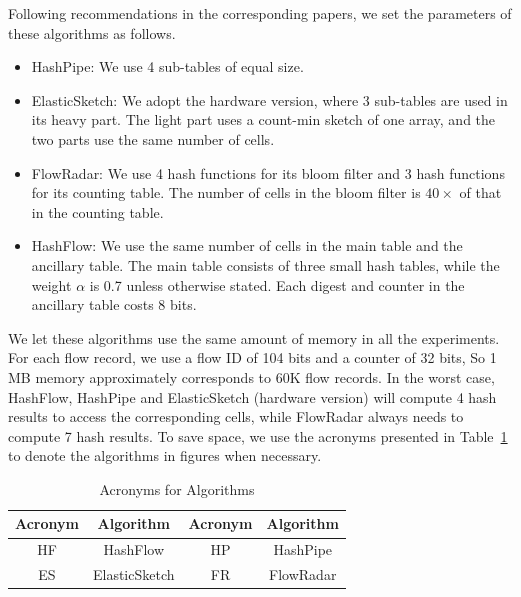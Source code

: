 Following recommendations in the corresponding papers, we set the parameters of these algorithms as follows. 
\begin{itemize}
    \item HashPipe: We use 4 sub-tables of equal size.
    \item ElasticSketch: We adopt the hardware version, where 3 sub-tables
are used in its heavy part. The light part uses a count-min sketch of one array, 
and the two parts use the same number of cells.
    \item FlowRadar:  We use 4 hash functions for its bloom filter and 3 hash functions for its counting table.
The number of cells in the bloom filter is $40\times$ of that in the counting table. 
    \item HashFlow: We use the same number of cells in the main table and the ancillary table. 
The main table consists of three small hash tables, while the weight $\alpha$ is 0.7 unless otherwise stated. 
Each digest and counter in the ancillary table costs 8 bits.
\end{itemize}

We let these algorithms use the same amount of memory in all the experiments. 
For each flow record, we use a flow ID of 104 bits and a counter of 32 bits,
So 1 MB memory approximately corresponds to 60K flow records.
In the worst case, HashFlow, HashPipe and ElasticSketch (hardware version) will compute 4 hash results 
to access the corresponding cells, while FlowRadar always needs to compute 7 hash results. To save space, we use the acronyms presented in Table~\ref{table:acronyms} to denote the algorithms in figures when necessary. 

\begin{table}[ht!]
	\centering
	\caption{Acronyms for Algorithms}
	\label{table:acronyms}
	\begin{tabular} { c | c | c | c}
	\hline\hline
	Acronym & Algorithm & Acronym & Algorithm\\
	\hline
	HF & HashFlow & HP & HashPipe\\
	ES & ElasticSketch & FR & FlowRadar\\
	\hline%
	\end{tabular}
\end{table}








